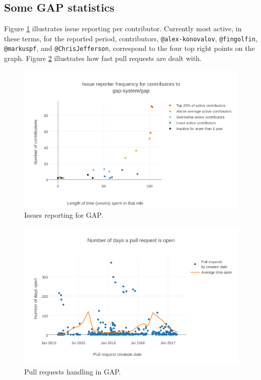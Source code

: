 \documentclass{deliverablereport}
\begin{document}
\subsection*{Some GAP statistics}
Figure \ref{wp7:fig:GAPissues} illustrates issue reporting
per contributor.
Currently most active, in these terms,
for the reported period, contributors, {\tt @alex-konovalov},
{\tt @fingolfin}, {\tt @markuspf}, and {\tt @ChrisJefferson}, 
correspond to the four top right points on the graph. 
Figure \ref{wp7:fig:GAPpulls} illustrates how fast pull
requests are dealt with.

\begin{figure}[ht]
  \includegraphics[width=\textwidth]{gap-issuereporting}
    \caption{Issues reporting for GAP.
    \label{wp7:fig:GAPissues}}
\end{figure}

\begin{figure}[ht]
  \includegraphics[width=\textwidth]{gap-pullrequests}
    \caption{Pull requests handling in GAP.\label{wp7:fig:GAPpulls}}
\end{figure}
\end{document}
